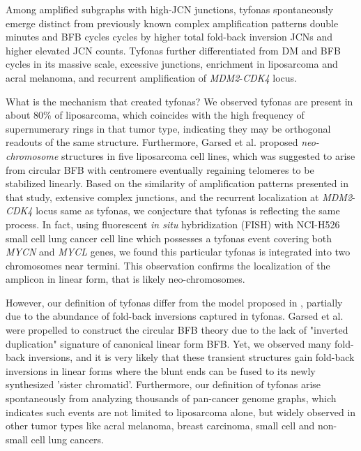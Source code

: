 \documentclass[phd,tocprelim]{cornell}
\begin{document}
Among amplified subgraphs with high-JCN junctions, tyfonas spontaneously emerge distinct from previously known complex amplification patterns double minutes and BFB cycles cycles by higher total fold-back inversion JCNs and higher elevated JCN counts. Tyfonas further differentiated from DM and BFB cycles in its massive scale, excessive junctions, enrichment in liposarcoma and acral melanoma, and recurrent amplification of \textit{MDM2}-\textit{CDK4} locus.

What is the mechanism that created tyfonas? We observed tyfonas are present in about 80\% of liposarcoma, which coincides with the high frequency of supernumerary rings in that tumor type, indicating they may be orthogonal readouts of the same structure. Furthermore, Garsed et al. \cite{garsed2014} proposed \textit{neo-chromosome} structures in five liposarcoma cell lines, which was suggested to arise from circular BFB with centromere eventually regaining telomeres to be stabilized linearly. Based on the similarity of amplification patterns presented in that study, extensive complex junctions, and the recurrent localization at \textit{MDM2}-\textit{CDK4} locus same as tyfonas, we conjecture that tyfonas is reflecting the same process. In fact, using fluorescent \textit{in situ} hybridization (FISH) with NCI-H526 small cell lung cancer cell line which possesses a tyfonas event covering both \textit{MYCN} and \textit{MYCL} genes, we found this particular tyfonas is integrated into two chromosomes near termini. This observation confirms the localization of the amplicon in linear form, that is likely neo-chromosomes.

However, our definition of tyfonas differ from the model proposed in \cite{garsed2014}, partially due to the abundance of fold-back inversions captured in tyfonas. Garsed et al. were propelled to construct the circular BFB theory due to the lack of "inverted duplication" signature of canonical linear form BFB. Yet, we observed many fold-back inversions, and it is very likely that these transient structures gain fold-back inversions in linear forms where the blunt ends can be fused to its newly synthesized 'sister chromatid'. Furthermore, our definition of tyfonas arise spontaneously from analyzing thousands of pan-cancer genome graphs, which indicates such events are not limited to liposarcoma alone, but widely observed in other tumor types like acral melanoma, breast carcinoma, small cell  and non-small cell lung cancers. 
\end{document}
